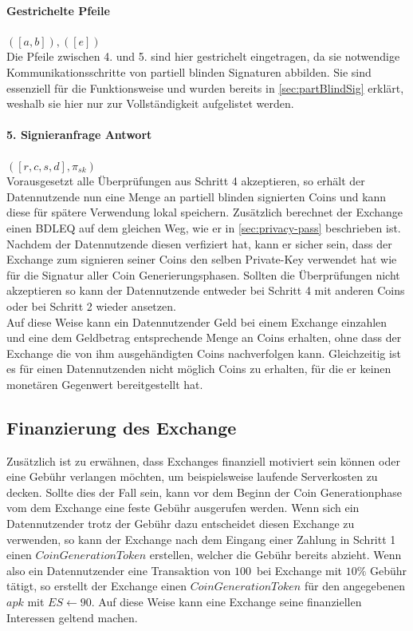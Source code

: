\documentclass[
	fontsize=12pt,
	headings=small,
	parskip=half,           %
	bibliography=totoc,
	numbers=noenddot,       %
	open=any,               %
]{scrreprt}
\begin{document}
\paragraph*{Gestrichelte Pfeile} $([a,b]), ([e])$\\
Die Pfeile zwischen 4. und 5. sind hier gestrichelt eingetragen, da sie notwendige Kommunikationsschritte von partiell blinden Signaturen abbilden. Sie sind essenziell für die Funktionsweise und wurden bereits in \ref{sec:partBlindSig} erklärt, weshalb sie hier nur zur Vollständigkeit aufgelistet werden.

\paragraph{5. Signieranfrage Antwort} $([r,c,s,d], \pi_{sk})$ \\
Vorausgesetzt alle Überprüfungen aus Schritt 4 akzeptieren, so erhält der Datennutzende nun eine Menge an partiell blinden signierten Coins und kann diese für spätere Verwendung lokal speichern. Zusätzlich berechnet der Exchange einen BDLEQ auf dem gleichen Weg, wie er in \ref{sec:privacy-pass} beschrieben ist. Nachdem der Datennutzende diesen verfiziert hat, kann er sicher sein, dass der Exchange zum signieren seiner Coins den selben Private-Key verwendet hat wie für die Signatur aller Coin Generierungsphasen. Sollten die Überprüfungen nicht akzeptieren so kann der Datennutzende entweder bei Schritt 4 mit anderen Coins oder bei Schritt 2 wieder ansetzen.\\

Auf diese Weise kann ein Datennutzender Geld bei einem Exchange einzahlen und eine dem Geldbetrag entsprechende Menge an Coins erhalten, ohne dass der Exchange die von ihm ausgehändigten Coins nachverfolgen kann. Gleichzeitig ist es für einen Datennutzenden nicht möglich Coins zu erhalten, für die er keinen monetären Gegenwert bereitgestellt hat.
\subsection{Finanzierung des Exchange}
Zusätzlich ist zu erwähnen, dass Exchanges finanziell motiviert sein können oder eine Gebühr verlangen möchten, um beispielsweise laufende Serverkosten zu decken. Sollte dies der Fall sein, kann vor dem Beginn der Coin Generationphase vom dem Exchange eine feste Gebühr ausgerufen werden. Wenn sich ein Datennutzender trotz der Gebühr dazu entscheidet diesen Exchange zu verwenden, so kann der Exchange nach dem Eingang einer Zahlung in Schritt 1 einen $CoinGenerationToken$ erstellen, welcher die Gebühr bereits abzieht. Wenn also ein Datennutzender eine Transaktion von $100$\texteuro\ bei Exchange mit $10\%$ Gebühr tätigt, so erstellt der Exchange einen $CoinGenerationToken$ für den angegebenen $apk$ mit $ES \leftarrow 90$\texteuro. Auf diese Weise kann eine Exchange seine finanziellen Interessen geltend machen. 
\end{document}

